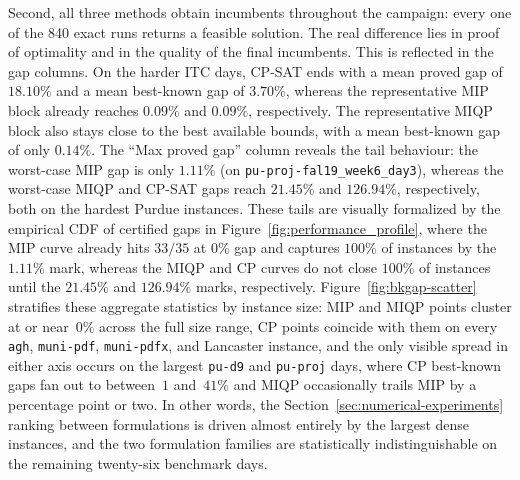 \documentclass[11pt]{article}
\begin{document}
Second, all three methods obtain incumbents throughout the campaign: every one of the 840 exact runs returns a feasible solution. The real difference lies in proof of optimality and in the quality of the final incumbents. This is reflected in the gap columns. On the harder ITC days, CP-SAT ends with a mean proved gap of $18.10\%$ and a mean best-known gap of $3.70\%$, whereas the representative MIP block already reaches $0.09\%$ and $0.09\%$, respectively. The representative MIQP block also stays close to the best available bounds, with a mean best-known gap of only $0.14\%$. The ``Max proved gap'' column reveals the tail behaviour: the worst-case MIP gap is only $1.11\%$ (on \texttt{pu-proj-fal19\_week6\_day3}), whereas the worst-case MIQP and CP-SAT gaps reach $21.45\%$ and $126.94\%$, respectively, both on the hardest Purdue instances. These tails are visually formalized by the empirical CDF of certified gaps in Figure~\ref{fig:performance_profile}, where the MIP curve already hits $33/35$ at $0\%$ gap and captures $100\%$ of instances by the $1.11\%$ mark, whereas the MIQP and CP curves do not close $100\%$ of instances until the $21.45\%$ and $126.94\%$ marks, respectively. Figure~\ref{fig:bkgap-scatter} stratifies these aggregate statistics by instance size: MIP and MIQP points cluster at or near~$0\%$ across the full size range, CP points coincide with them on every \texttt{agh}, \texttt{muni-pdf}, \texttt{muni-pdfx}, and Lancaster instance, and the only visible spread in either axis occurs on the largest \texttt{pu-d9} and \texttt{pu-proj} days, where CP best-known gaps fan out to between~$1$ and~$41\%$ and MIQP occasionally trails MIP by a percentage point or two. In other words, the Section~\ref{sec:numerical-experiments} ranking between formulations is driven almost entirely by the largest dense instances, and the two formulation families are statistically indistinguishable on the remaining twenty-six benchmark days.
\end{document}
